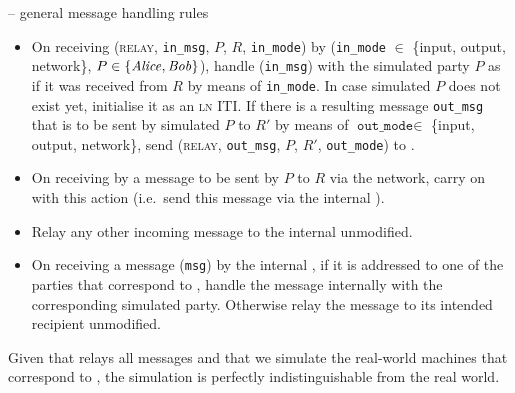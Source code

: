 \begin{center}
  \begin{simulatorbox}{\simulator{} -- general message handling rules}
    \begin{itemize}
      \item On receiving (\textsc{relay}, \texttt{in\_msg}, $P$, $R$,
      \texttt{in\_mode}) by \fchan (\texttt{in\_mode} $\in$ \{input, output,
      network\}, $P \in \{\mathit{Alice}, \mathit{Bob}\}$), handle (\texttt{in\_msg}) with the
      simulated party $P$ as if it was received from $R$ by means of
      \texttt{in\_mode}. In case simulated $P$ does not exist yet, initialise it
      as an \textsc{ln} ITI. If there is a resulting message \texttt{out\_msg}
      that is to be sent by simulated $P$ to $R'$ by means of
      $\texttt{out\_mode} \in$ \{input, output, network\}, send (\textsc{relay},
      \texttt{out\_msg}, $P$, $R'$, \texttt{out\_mode}) to \fchan.
      \item On receiving by \fchan a message to be sent by $P$ to $R$ via the
      network, carry on with this action (i.e.\ send this message via the
      internal \adversary).
      \item Relay any other incoming message to the internal \adversary
      unmodified.
      \item On receiving a message (\texttt{msg}) by the internal \adversary, if it is
      addressed to one of the parties that correspond to \fchan, handle the
      message internally with the corresponding simulated party. Otherwise relay
      the message to its intended recipient unmodified. 
    \end{itemize}

    Given that \fchan relays all messages and that we simulate the real-world
    machines that correspond to \fchan, the simulation is perfectly
    indistinguishable from the real world.
  \end{simulatorbox}
  \label{code:simulator:flow}
\end{center} \ \\

